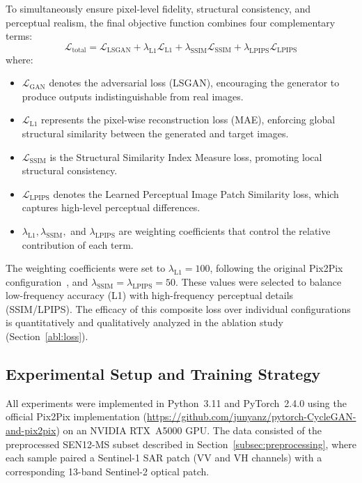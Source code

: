 \documentclass[remotesensing,article,submit,pdftex,moreauthors]{Definitions/mdpi}
\begin{document}
To simultaneously ensure pixel-level fidelity, structural consistency, and perceptual realism, the final objective function combines four complementary terms:
\begin{equation}
    \mathcal{L}_{\text{total}} = \mathcal{L}_{\text{LSGAN}} + \lambda_{\text{L1}} \mathcal{L}_{\text{L1}} + \lambda_{\text{SSIM}} \mathcal{L}_{\text{SSIM}} + \lambda_{\text{LPIPS}} \mathcal{L}_{\text{LPIPS}}
\end{equation}
where:
\begin{itemize}
    \item $\mathcal{L}_{\text{GAN}}$ denotes the adversarial loss (LSGAN), encouraging the generator to produce outputs indistinguishable from real images. 
    \item $\mathcal{L}_{\text{L1}}$ represents the pixel-wise reconstruction loss (MAE), enforcing global structural similarity between the generated and target images.
    \item $\mathcal{L}_{\text{SSIM}}$ is the Structural Similarity Index Measure loss, promoting local structural consistency.
    \item $\mathcal{L}_{\text{LPIPS}}$ denotes the Learned Perceptual Image Patch Similarity loss, which captures high-level perceptual differences.
    \item $\lambda_{\text{L1}}, \lambda_{\text{SSIM}},$ and $\lambda_{\text{LPIPS}}$ are weighting coefficients that control the relative contribution of each term.
\end{itemize}

The weighting coefficients were set to $\lambda_{\text{L1}} = 100$, following the original Pix2Pix configuration~\cite{pix2pix_2018}, and $\lambda_{\text{SSIM}} = \lambda_{\text{LPIPS}} = 50$. These values were selected to balance low-frequency accuracy (L1) with high-frequency perceptual details (SSIM/LPIPS). The efficacy of this composite loss over individual configurations is quantitatively and qualitatively analyzed in the ablation study (Section~\ref{abl:loss}).

\subsection{Experimental Setup and Training Strategy}
\label{sec:experimental_setup}

All experiments were implemented in Python~3.11 and PyTorch~2.4.0 using the official Pix2Pix implementation (\url{https://github.com/junyanz/pytorch-CycleGAN-and-pix2pix}) on an NVIDIA RTX~A5000 GPU. The data consisted of the preprocessed SEN12-MS subset described in Section~\ref{subsec:preprocessing}, where each sample paired a Sentinel-1 SAR patch (VV and VH channels) with a corresponding 13-band Sentinel-2 optical patch.
\end{document}
